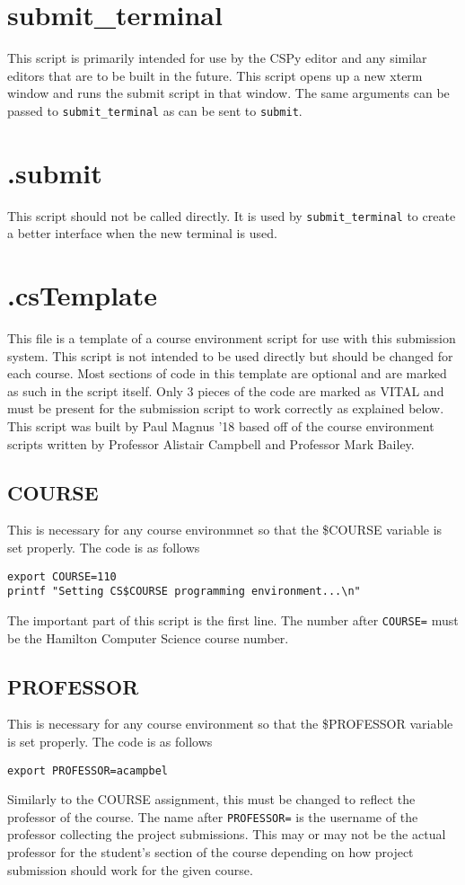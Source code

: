 \documentclass{article}
\begin{document}
\section{submit\_terminal}
This script is primarily intended for use by the CSPy editor and any similar editors that are to be built in the future. This script opens up a new xterm window and runs the submit script in that window. The same arguments can be passed to \verb|submit_terminal| as can be sent to \verb|submit|.

\section{.submit}
This script should not be called directly. It is used by \verb|submit_terminal| to create a better interface when the new terminal is used.

\section{.csTemplate}
This file is a template of a course environment script for use with this submission system.
This script is not intended to be used directly but should be changed for each course.
Most sections of code in this template are optional and are marked as such in the script itself.
Only 3 pieces of the code are marked as VITAL and must be present for the submission script to work correctly as explained below.
This script was built by Paul Magnus '18 based off of the course environment scripts written by Professor Alistair Campbell and Professor Mark Bailey.

\subsection*{COURSE}
This is necessary for any course environmnet so that the \$COURSE variable is set properly. The code is as follows
\begin{verbatim}
export COURSE=110
printf "Setting CS$COURSE programming environment...\n"
\end{verbatim}
The important part of this script is the first line. The number after \verb|COURSE=| must be the Hamilton Computer Science course number.

\subsection*{PROFESSOR}
This is necessary for any course environment so that the \$PROFESSOR variable is set properly. The code is as follows
\begin{verbatim}
export PROFESSOR=acampbel
\end{verbatim}
Similarly to the COURSE assignment, this must be changed to reflect the professor of the course. The name after \verb|PROFESSOR=| is the username of the professor collecting the project submissions. This may or may not be the actual professor for the student's section of the course depending on how project submission should work for the given course.
\pagebreak
\end{document}
